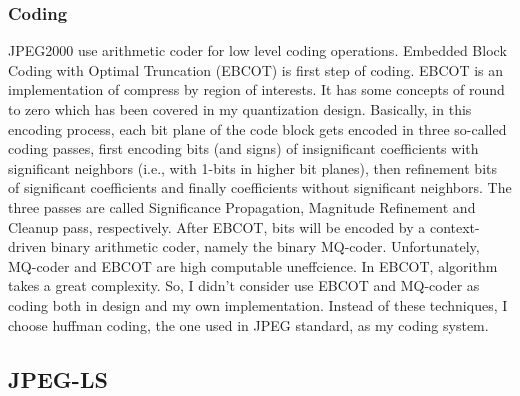 \documentclass[UTF8, letterpaper, 14pt]{article}
\begin{document}
\subsubsection{Coding}
JPEG2000 use arithmetic coder for low level coding operations. Embedded Block Coding with Optimal Truncation (EBCOT) is first step of coding. EBCOT is an implementation of compress by region of interests. It has some concepts of round to zero which has been covered in my quantization design. Basically, in this encoding process, each bit plane of the code block gets encoded in three so-called coding passes, first encoding bits (and signs) of insignificant coefficients with significant neighbors (i.e., with 1-bits in higher bit planes), then refinement bits of significant coefficients and finally coefficients without significant neighbors. The three passes are called Significance Propagation, Magnitude Refinement and Cleanup pass, respectively.\cite{jpeg2kwiki} After EBCOT, bits will be encoded by a context-driven binary arithmetic coder, namely the binary MQ-coder.
Unfortunately, MQ-coder and EBCOT are high computable uneffcience. In EBCOT, algorithm takes a great complexity. So, I didn't consider use EBCOT and MQ-coder as coding both in design and my own implementation. Instead of these techniques, I choose huffman coding, the one used in JPEG standard, as my coding system.
\subsection{JPEG-LS}
\end{document}
